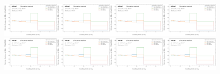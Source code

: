 \begin{figure}[h!]
\centering
\includegraphics[width=0.25\textwidth,page=1]{figures/SimResults/MultiFold_TrackJet_SystEffect.pdf}\includegraphics[width=0.25\textwidth,page=2]{figures/SimResults/MultiFold_TrackJet_SystEffect.pdf}\includegraphics[width=0.25\textwidth,page=3]{figures/SimResults/MultiFold_TrackJet_SystEffect.pdf}\includegraphics[width=0.25\textwidth,page=4]{figures/SimResults/MultiFold_TrackJet_SystEffect.pdf}\\
\includegraphics[width=0.25\textwidth,page=5]{figures/SimResults/MultiFold_TrackJet_SystEffect.pdf}\includegraphics[width=0.25\textwidth,page=6]{figures/SimResults/MultiFold_TrackJet_SystEffect.pdf}\includegraphics[width=0.25\textwidth,page=7]{figures/SimResults/MultiFold_TrackJet_SystEffect.pdf}\includegraphics[width=0.25\textwidth,page=8]{figures/SimResults/MultiFold_TrackJet_SystEffect.pdf}\\

\end{figure}
